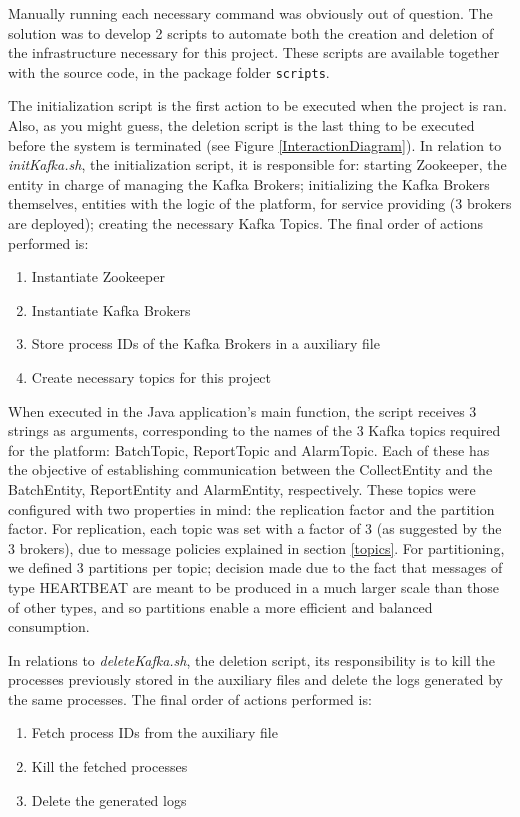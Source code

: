 \documentclass[12pt]{article}
\begin{document}
Manually running each necessary command was obviously out of question.
The solution was to develop 2 scripts to automate both the creation and deletion of the infrastructure necessary for this project. 
These scripts are available together with the source code, in the package folder \texttt{scripts}.

The initialization script is the first action to be executed when the project is ran.
Also, as you might guess, the deletion script is the last thing to be executed before the system is terminated (see Figure \ref{InteractionDiagram}).
In relation to \textit{initKafka.sh}, the initialization script, it is responsible for: starting Zookeeper, the entity in charge of managing the Kafka Brokers;
initializing the Kafka Brokers themselves, entities with the logic of the platform, for service providing (3 brokers are deployed); creating the necessary Kafka Topics.
The final order of actions performed is:
\vspace{-10pt}
\begin{enumerate} [noitemsep]
  \item Instantiate Zookeeper
  \item Instantiate Kafka Brokers
  \item Store process IDs of the Kafka Brokers in a auxiliary file
  \item Create necessary topics for this project
\end{enumerate}
\vspace{-10pt}

When executed in the Java application's main function, the script receives 3 strings as arguments, corresponding to the names of the 3 Kafka topics required for
the platform: BatchTopic, ReportTopic and AlarmTopic.
Each of these has the objective of establishing communication between the CollectEntity and the BatchEntity, ReportEntity and AlarmEntity, respectively. 
These topics were configured with two properties in mind: the replication factor and the partition factor.
For replication, each topic was set with a factor of 3 (as suggested by the 3 brokers), due to message policies explained in section \ref{topics}.
For partitioning, we defined 3 partitions per topic; decision made due to the fact that messages of type HEARTBEAT are meant to be produced in a much larger 
scale than those of other types, and so partitions enable a more efficient and balanced consumption.

In relations to \textit{deleteKafka.sh}, the deletion script, its responsibility is to kill the processes previously stored in the auxiliary files and delete 
the logs generated by the same processes.
The final order of actions performed is:
\vspace{-10pt}
\begin{enumerate} [noitemsep]
  \item Fetch process IDs from the auxiliary file
  \item Kill the fetched processes
  \item Delete the generated logs
\end{enumerate}
\vspace{-10pt}
\end{document}
